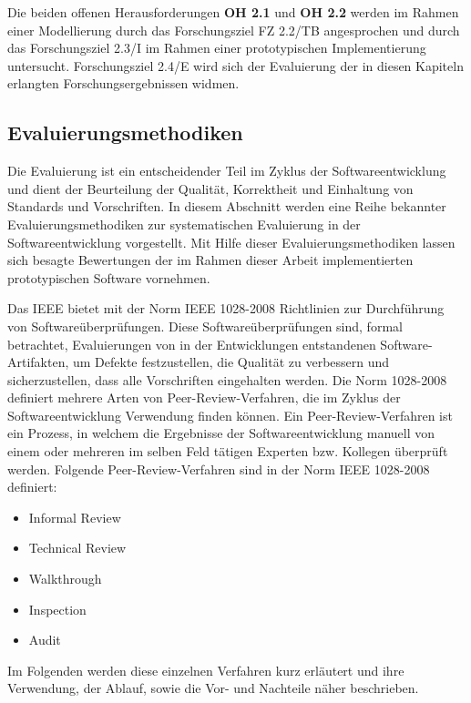 Die beiden offenen Herausforderungen \textbf{OH 2.1} und \textbf{OH 2.2} werden im Rahmen einer Modellierung durch das Forschungsziel FZ 2.2/TB angesprochen und durch das Forschungsziel 2.3/I im Rahmen einer prototypischen Implementierung untersucht.
Forschungsziel 2.4/E wird sich der Evaluierung der in diesen Kapiteln erlangten Forschungsergebnissen widmen.

\clearpage

\subsection{Evaluierungsmethodiken}
\label{sec2:sota:subsec:eval-methodology}
Die Evaluierung ist ein entscheidender Teil im Zyklus der Softwareentwicklung und dient der Beurteilung der Qualität, Korrektheit und Einhaltung von Standards und Vorschriften.
In diesem Abschnitt werden eine Reihe bekannter Evaluierungsmethodiken zur systematischen Evaluierung in der Softwareentwicklung vorgestellt.
Mit Hilfe dieser Evaluierungsmethodiken lassen sich besagte Bewertungen der im Rahmen dieser Arbeit implementierten prototypischen Software vornehmen.

Das IEEE \cite{ieee} bietet mit der Norm IEEE 1028-2008 \cite{ieee-1028-2008} Richtlinien zur Durchführung von Softwareüberprüfungen.
Diese Softwareüberprüfungen sind, formal betrachtet, Evaluierungen von in der Entwicklungen entstandenen Software-Artifakten, um Defekte festzustellen, die Qualität zu verbessern und sicherzustellen, dass alle Vorschriften eingehalten werden.
Die Norm 1028-2008 definiert mehrere Arten von Peer-Review-Verfahren, die im Zyklus der Softwareentwicklung Verwendung finden können.
Ein Peer-Review-Verfahren ist ein Prozess, in welchem die Ergebnisse der Softwareentwicklung manuell von einem oder mehreren im selben Feld tätigen Experten bzw. Kollegen überprüft werden.
Folgende Peer-Review-Verfahren sind in der Norm IEEE 1028-2008 definiert:
\begin{itemize}
    \item Informal Review
    \item Technical Review
    \item Walkthrough
    \item Inspection
    \item Audit
\end{itemize}
Im Folgenden werden diese einzelnen Verfahren kurz erläutert und ihre Verwendung, der Ablauf, sowie die Vor- und Nachteile näher beschrieben.

